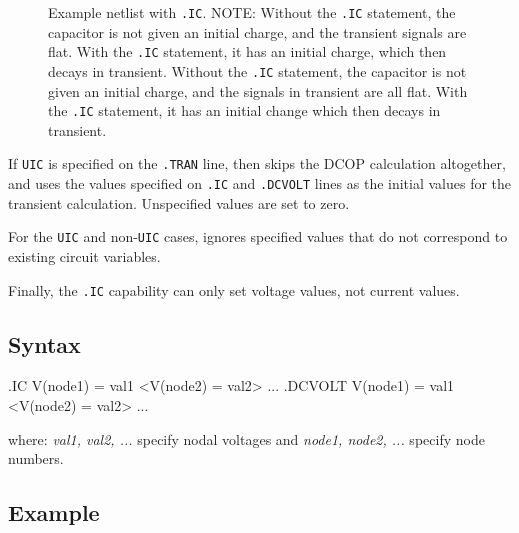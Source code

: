 \begin{figure}[htbp]
\begin{centering}
\caption[Example netlist with \texttt{.IC}.]{Example netlist with \texttt{.IC}. 
NOTE:	Without the \texttt{.IC} statement, the capacitor is not given an initial charge, and the transient signals are flat. With the \texttt{.IC} statement, it has an initial charge, which then decays in transient. Without the \texttt{.IC} statement, the capacitor is not given an initial charge, and the signals in transient are all flat.  With the \texttt{.IC} statement, it has an initial change which then decays in transient.  \label{IC_Netlist_2}}
\end{centering}
\end{figure}

If \texttt{UIC} is specified on the \texttt{.TRAN} line, then \Xyce{}
skips the DCOP calculation altogether, and uses the values specified
on \texttt{.IC} and \texttt{.DCVOLT} lines as the initial values for
the transient calculation.  Unspecified values are set to zero.

For the \texttt{UIC} and non-\texttt{UIC} cases, \Xyce{} ignores
specified values that do not correspond to existing circuit variables.

Finally, the \texttt{.IC} capability can only set voltage values, not current values.

\subsection{Syntax}

\begin{vquote}
.IC V(node1) = val1 <V(node2) = val2> ...
.DCVOLT V(node1) = val1 <V(node2) = val2> ...
\end{vquote}

where:  \emph{val1, val2, ...} specify nodal voltages and \emph{node1, node2, ...} specify node numbers.

\subsection{Example}

